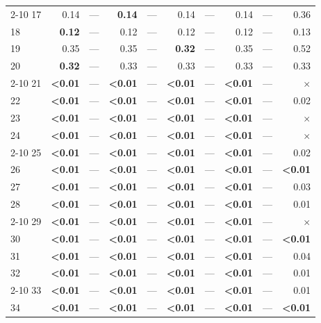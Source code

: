 \begin{longtable}{lr@{\hskip 4pt}l@{\hskip 12pt}r@{\hskip 4pt}l@{\hskip 12pt}r@{\hskip 4pt}l@{\hskip 12pt}r@{\hskip 4pt}l@{\hskip 12pt}r}
\cmidrule{2-10}
17 & 0.14 & --- & \textbf{0.14} & --- & 0.14 & --- & 0.14 & --- & 0.36 \\
18 & \textbf{0.12} & --- & 0.12 & --- & 0.12 & --- & 0.12 & --- & 0.13 \\
19 & 0.35 & --- & 0.35 & --- & \textbf{0.32} & --- & 0.35 & --- & 0.52 \\
20 & \textbf{0.32} & --- & 0.33 & --- & 0.33 & --- & 0.33 & --- & 0.33 \\
\cmidrule{2-10}
21 & \textbf{<0.01} & --- & \textbf{<0.01} & --- & \textbf{<0.01} & --- & \textbf{<0.01} & --- & $\times$ \\
22 & \textbf{<0.01} & --- & \textbf{<0.01} & --- & \textbf{<0.01} & --- & \textbf{<0.01} & --- & 0.02 \\
23 & \textbf{<0.01} & --- & \textbf{<0.01} & --- & \textbf{<0.01} & --- & \textbf{<0.01} & --- & $\times$ \\
24 & \textbf{<0.01} & --- & \textbf{<0.01} & --- & \textbf{<0.01} & --- & \textbf{<0.01} & --- & $\times$ \\
\cmidrule{2-10}
25 & \textbf{<0.01} & --- & \textbf{<0.01} & --- & \textbf{<0.01} & --- & \textbf{<0.01} & --- & 0.02 \\
26 & \textbf{<0.01} & --- & \textbf{<0.01} & --- & \textbf{<0.01} & --- & \textbf{<0.01} & --- & \textbf{<0.01} \\
27 & \textbf{<0.01} & --- & \textbf{<0.01} & --- & \textbf{<0.01} & --- & \textbf{<0.01} & --- & 0.03 \\
28 & \textbf{<0.01} & --- & \textbf{<0.01} & --- & \textbf{<0.01} & --- & \textbf{<0.01} & --- & 0.01 \\
\cmidrule{2-10}
29 & \textbf{<0.01} & --- & \textbf{<0.01} & --- & \textbf{<0.01} & --- & \textbf{<0.01} & --- & $\times$ \\
30 & \textbf{<0.01} & --- & \textbf{<0.01} & --- & \textbf{<0.01} & --- & \textbf{<0.01} & --- & \textbf{<0.01} \\
31 & \textbf{<0.01} & --- & \textbf{<0.01} & --- & \textbf{<0.01} & --- & \textbf{<0.01} & --- & 0.04 \\
32 & \textbf{<0.01} & --- & \textbf{<0.01} & --- & \textbf{<0.01} & --- & \textbf{<0.01} & --- & 0.01 \\
\cmidrule{2-10}
33 & \textbf{<0.01} & --- & \textbf{<0.01} & --- & \textbf{<0.01} & --- & \textbf{<0.01} & --- & 0.01 \\
34 & \textbf{<0.01} & --- & \textbf{<0.01} & --- & \textbf{<0.01} & --- & \textbf{<0.01} & --- & \textbf{<0.01} \\

\end{longtable}
